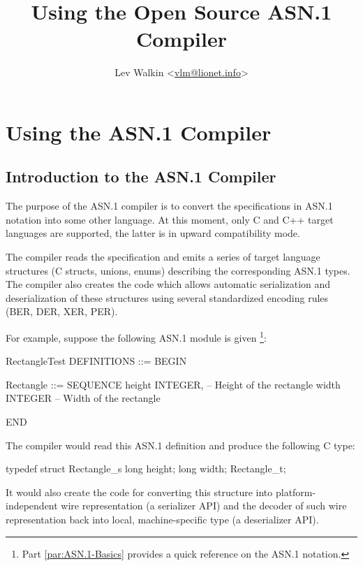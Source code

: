 \documentclass[english,oneside,12pt]{book}
\begin{document}
\title{Using the Open Source ASN.1 Compiler}
\author{Lev Walkin <\href{mailto:vlm@lionet.info?Subject=asn1c}{vlm@lionet.info}>}

\pagestyle{fancy}
\fancyhead[L]{\leftmark}
\maketitle

\tableofcontents{}

\part{Using the ASN.1 Compiler}


\chapter{Introduction to the ASN.1 Compiler}

The purpose of the ASN.1 compiler is to convert the specifications
in ASN.1 notation into some other language. At this moment, only C
and C++ target languages are supported, the latter is in upward compatibility
mode.

The compiler reads the specification and emits a series of target
language structures (C structs, unions, enums) describing the corresponding
ASN.1 types. The compiler also creates the code which allows automatic
serialization and deserialization of these structures using several
standardized encoding rules (BER, DER, XER, PER).

For example, suppose the following ASN.1 module is given%
\footnote{Part \vref{par:ASN.1-Basics} provides a quick reference
on the ASN.1 notation.}:
\begin{asn}
RectangleTest DEFINITIONS ::= BEGIN

Rectangle ::= SEQUENCE {
    height  INTEGER,        -- Height of the rectangle
    width   INTEGER         -- Width of the rectangle
}

END
\end{asn}
The compiler would read this ASN.1 definition and produce the following
C type:
\begin{codesample}
typedef struct Rectangle_s {
    long height;
    long width;
} Rectangle_t;
\end{codesample}
It would also create the code for converting this structure into platform-independent
wire representation (a serializer API) and the decoder of such wire
representation back into local, machine-specific type (a deserializer
API).
\end{document}
